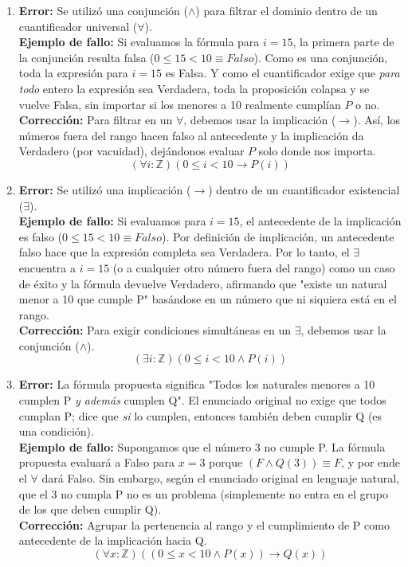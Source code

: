 \begin{enumerate}[label=\textbf{\alph*)}]

    \item \textbf{Error:} Se utilizó una conjunción ($\wedge$) para filtrar el dominio dentro de un cuantificador universal ($\forall$). \\
    \textbf{Ejemplo de fallo:} Si evaluamos la fórmula para $i=15$, la primera parte de la conjunción resulta falsa ($0 \leq 15 < 10 \equiv Falso$). Como es una conjunción, toda la expresión para $i=15$ es Falsa. Y como el cuantificador exige que \textit{para todo} entero la expresión sea Verdadera, toda la proposición colapsa y se vuelve Falsa, sin importar si los menores a 10 realmente cumplían $P$ o no. \\
    \textbf{Corrección:} Para filtrar en un $\forall$, debemos usar la implicación ($\rightarrow$). Así, los números fuera del rango hacen falso al antecedente y la implicación da Verdadero (por vacuidad), dejándonos evaluar $P$ solo donde nos importa.
    \[ (\forall i:\mathbb{Z})(0 \leq i < 10 \rightarrow P(i)) \]

    \vspace{0.4cm}
    \item \textbf{Error:} Se utilizó una implicación ($\rightarrow$) dentro de un cuantificador existencial ($\exists$). \\
    \textbf{Ejemplo de fallo:} Si evaluamos para $i=15$, el antecedente de la implicación es falso ($0 \leq 15 < 10 \equiv Falso$). Por definición de implicación, un antecedente falso hace que la expresión completa sea Verdadera. Por lo tanto, el $\exists$ encuentra a $i=15$ (o a cualquier otro número fuera del rango) como un caso de éxito y la fórmula devuelve Verdadero, afirmando que "existe un natural menor a 10 que cumple P" basándose en un número que ni siquiera está en el rango. \\
    \textbf{Corrección:} Para exigir condiciones simultáneas en un $\exists$, debemos usar la conjunción ($\wedge$).
    \[ (\exists i:\mathbb{Z})(0 \leq i < 10 \wedge P(i)) \]

    \vspace{0.4cm}
    \item \textbf{Error:} La fórmula propuesta significa "Todos los naturales menores a 10 cumplen P \textit{y además} cumplen Q". El enunciado original no exige que todos cumplan P; dice que \textit{si} lo cumplen, entonces también deben cumplir Q (es una condición). \\
    \textbf{Ejemplo de fallo:} Supongamos que el número 3 no cumple P. La fórmula propuesta evaluará a Falso para $x=3$ porque $(F \wedge Q(3)) \equiv F$, y por ende el $\forall$ dará Falso. Sin embargo, según el enunciado original en lenguaje natural, que el 3 no cumpla P no es un problema (simplemente no entra en el grupo de los que deben cumplir Q). \\
    \textbf{Corrección:} Agrupar la pertenencia al rango y el cumplimiento de P como antecedente de la implicación hacia Q.
    \[ (\forall x:\mathbb{Z})((0 \leq x < 10 \wedge P(x)) \rightarrow Q(x)) \]


\end{enumerate}
